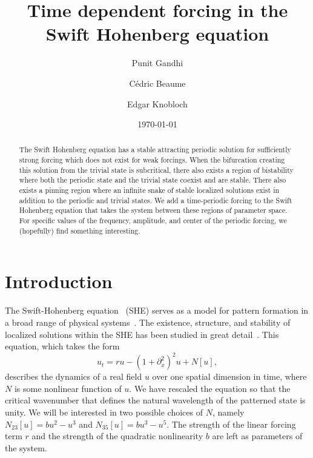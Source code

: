 \documentclass[pre,preprint,superscriptaddress]{revtex4-1}
\begin{document}
\title{Time dependent forcing in the Swift Hohenberg equation}
\author{Punit Gandhi}
\author{C\'edric Beaume}
\author{Edgar Knobloch}
\date{\today}

\begin{abstract}
The Swift Hohenberg equation has a stable attracting periodic solution for sufficiently strong forcing which does not exist for weak forcings.  When the bifurcation creating this solution from the trivial state is subcritical, there also exists a region of bistability where both the periodic state and the trivial state coexist and are stable.  There also exists a pinning region where an infinite snake of stable localized solutions exist in addition to the periodic and trivial states.   We add a time-periodic forcing to the Swift Hohenberg equation that takes the system between these regions of parameter space.  For specific values of the frequency, amplitude, and center of the periodic forcing, we (hopefully) find something interesting.
\end{abstract}

\maketitle

\section{Introduction}
The Swift-Hohenberg equation~\cite{swift1977} (SHE) serves as a model for pattern formation in a broad range of physical systems~\cite{}.  The existence, structure, and stability of localized solutions within the SHE has been studied in great detail~\cite{burke2006,burke2007snakes,burke2007stability}.   This equation, which takes the form  
\begin{equation}
u_t= r u-\left(1+\partial_{x}^2\right)^2u+N[u]\label{eq:SH},
\end{equation}
describes the dynamics of a real field $u$ over one spatial dimension in time, where $N$ is some nonlinear function of $u$.  We have rescaled the equation so that the critical wavenumber that defines the natural wavelength of the patterned state is unity.  We will be interested in two possible choices of $N$, namely $N_{23}[u]=bu^2-u^3$ and $N_{35}[u]=b u^3-u^5$.  The strength of the linear forcing term $r$ and the strength of the quadratic nonlinearity $b$ are left as parameters of the system.  
\end{document}
